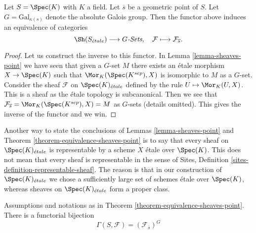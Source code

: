 \begin{theorem}
\label{theorem-equivalence-sheaves-point}
Let $S = \Spec(K)$ with $K$ a field.
Let $\overline{s}$ be a geometric point of $S$.
Let $G = \text{Gal}_{\kappa(s)}$ denote the absolute Galois group.
Then the functor above induces an equivalence of categories
$$
\Sh(S_{\acute{e}tale}) \longrightarrow G\textit{-Sets},
\quad
\mathcal{F} \longmapsto \mathcal{F}_{\overline{s}}.
$$
\end{theorem}

\begin{proof}
Let us construct the inverse to this functor. In
Lemma \ref{lemma-sheaves-point}
we have seen that given a $G$-set $M$ there exists an \'etale morphism
$X \to \Spec(K)$
such that $\Mor_K(\Spec(K^{sep}), X)$ is
isomorphic to $M$ as a $G$-set. Consider the sheaf
$\mathcal{F}$ on $\Spec(K)_{\acute{e}tale}$ defined by
the rule $U \mapsto \Mor_K(U, X)$. This is a sheaf as the \'etale
topology is subcanonical. Then we see that
$\mathcal{F}_{\overline{s}} = \Mor_K(\Spec(K^{sep}), X) = M$
as $G$-sets (details omitted). This gives the inverse of the functor and
we win.
\end{proof}

\begin{remark}
\label{remark-every-sheaf-representable}
Another way to state the conclusions of
Lemmas \ref{lemma-sheaves-point} and
Theorem \ref{theorem-equivalence-sheaves-point}
is to say that every sheaf on $\Spec(K)_{\acute{e}tale}$ is representable
by a scheme $X$ \'etale over $\Spec(K)$.
This does not mean that every sheaf is representable in the sense of
Sites, Definition \ref{sites-definition-representable-sheaf}.
The reason is that in our construction of $\Spec(K)_{\acute{e}tale}$
we chose a sufficiently large set of schemes \'etale over $\Spec(K)$,
whereas sheaves on $\Spec(K)_{\acute{e}tale}$ form a proper class.
\end{remark}

\begin{lemma}
\label{lemma-global-sections-point}
Assumptions and notations as in
Theorem \ref{theorem-equivalence-sheaves-point}.
There is a functorial bijection
$$
\Gamma(S, \mathcal{F}) = (\mathcal{F}_{\overline{s}})^G
$$
\end{lemma}


